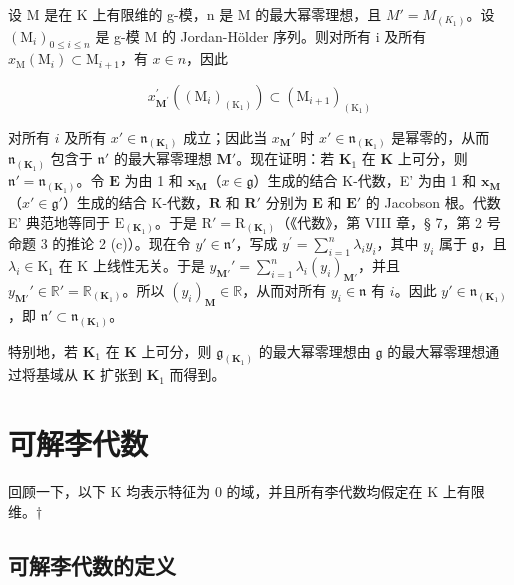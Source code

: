 设 M 是在 K 上有限维的 g-模，n 是 M 的最大幂零理想，且 \(M' = M_{(K_1)}\)。设 \((\mathrm{M}_i)_{0 \leq i \leq n}\) 是 g-模 M 的 Jordan-Hölder 序列。则对所有 i 及所有 \(x_{\mathrm{M}}(\mathrm{M}_i) \subset \mathrm{M}_{i+1}\)，有 \(x \in n\)，因此

\[
x _ {\mathbf {M} ^ {\prime}} ^ {\prime} \left(\left(\mathrm{M} _ {i}\right) _ {\left(\mathrm{K} _ {1}\right)}\right) \subset \left(\mathrm{M} _ {i + 1}\right) _ {\left(\mathrm{K} _ {1}\right)}
\]

对所有 \(i\) 及所有 \(x' \in \mathfrak{n}_{(\mathbf{K}_1)}\) 成立；因此当 \(x_{\mathbf{M}}'\) 时 \(x' \in \mathfrak{n}_{(\mathbf{K}_1)}\) 是幂零的，从而 \(\mathfrak{n}_{(\mathbf{K}_1)}\) 包含于 \(\mathfrak{n}'\) 的最大幂零理想 \(\mathbf{M}'\)。现在证明：若 \(\mathbf{K}_1\) 在 \(\mathbf{K}\) 上可分，则 \(\mathfrak{n}' = \mathfrak{n}_{(\mathbf{K}_1)}\)。令 \(\mathbf{E}\) 为由 1 和 \(\mathbf{x}_{\mathbf{M}}\)（\(x \in \mathfrak{g}\)）生成的结合 K-代数，E' 为由 1 和 \(\mathbf{x}_{\mathbf{M}}\)（\(x' \in \mathfrak{g}'\)）生成的结合 K-代数，\(\mathbf{R}\) 和 \(\mathbf{R}'\) 分别为 \(\mathbf{E}\) 和 \(\mathbf{E}'\) 的 Jacobson 根。代数 E' 典范地等同于 \(\mathrm{E}_{(\mathbf{K}_1)}\)。于是 \(\mathrm{R}' = \mathrm{R}_{(\mathbf{K}_1)}\)（《代数》，第 VIII 章，§ 7，第 2 号命题 3 的推论 2 (c)）。现在令 \(y' \in \mathfrak{n}'\)，写成 \(y^{\prime} = \sum_{i = 1}^{n}\lambda_{i}y_{i}\)，其中 \(y_{i}\) 属于 \(\mathfrak{g}\)，且 \(\lambda_{i}\in \mathrm{K}_{1}\) 在 K 上线性无关。于是 \(y_{\mathbf{M}'}' = \sum_{i=1}^{n} \lambda_i(y_i)_{\mathbf{M}'}\)，并且 \(y_{\mathbf{M}'}' \in \mathbb{R}' = \mathbb{R}_{(\mathbf{K}_1)}\)。所以 \((y_i)_{\mathbf{M}} \in \mathbb{R}\)，从而对所有 \(y_i \in \mathfrak{n}\) 有 \(i\)。因此 \(y' \in \mathfrak{n}_{(\mathbf{K}_1)}\)，即 \(\mathfrak{n}' \subset \mathfrak{n}_{(\mathbf{K}_1)}\)。

特别地，若 \(\mathbf{K}_1\) 在 \(\mathbf{K}\) 上可分，则 \(\mathfrak{g}_{(\mathbf{K}_1)}\) 的最大幂零理想由 \(\mathfrak{g}\) 的最大幂零理想通过将基域从 \(\mathbf{K}\) 扩张到 \(\mathbf{K}_1\) 而得到。

\section{可解李代数}

回顾一下，以下 K 均表示特征为 0 的域，并且所有李代数均假定在 K 上有限维。†

\subsection{可解李代数的定义}

